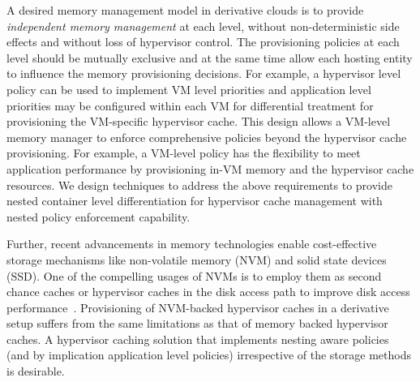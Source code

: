 %
%
A desired memory management model in derivative clouds is to
provide {\em independent memory management} at each level,
without non-deterministic side effects and without loss of
hypervisor control.
%
The provisioning policies at each level should be mutually
exclusive and at the same time allow each hosting entity
to influence the memory provisioning decisions.
%
For example, a hypervisor level policy can be used to 
implement VM level priorities and application level priorities 
may be configured within each VM for differential treatment
for provisioning the VM-specific hypervisor cache. 
%
This design allows a VM-level memory manager to
enforce comprehensive policies beyond the hypervisor cache 
provisioning.
%
For example, a VM-level policy has the flexibility to meet
application performance by provisioning in-VM memory and the
hypervisor cache resources.  
%
We design techniques to address the above requirements
to provide nested container level differentiation for
hypervisor cache management with nested policy enforcement
capability. 
%

%
%
% 
%
Further, recent advancements in memory technologies enable cost-effective
storage mechanisms like non-volatile memory (NVM) and solid state
devices (SSD).
%
One of the compelling usages of NVMs is to employ them
as second chance caches or hypervisor caches 
in the disk access path to improve disk access performance~\cite{extmem,sdc}.
%
%
%
Provisioning of NVM-backed hypervisor caches
in a derivative setup suffers from the same limitations as that
of memory backed hypervisor caches.
%
A hypervisor caching solution that implements
nesting aware policies (and by implication application level policies)
irrespective of the storage methods is desirable.
%
%
 


